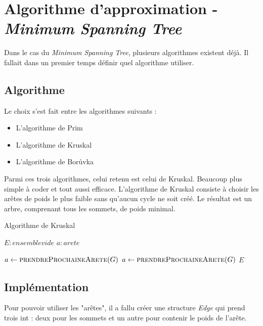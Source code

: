 \chapter{Algorithme d'approximation - \textit{Minimum Spanning Tree}}


Dans le cas du \textit{Minimum Spanning Tree}, plusieurs algorithmes existent déjà. Il fallait dans un premier temps définir quel algorithme utiliser.

\section{Algorithme}

Le choix s'est fait entre les algorithmes suivants :
\begin{itemize}
	\item L'algorithme de Prim
	\item L'algorithme de Kruskal
	\item L'algorithme de Borůvka
\end{itemize}

Parmi ces trois algorithmes, celui retenu est celui de Kruskal. Beaucoup plus simple à coder et tout aussi efficace.
L'algorithme de Kruskal consiste à choisir les arêtes de poids le plus faible sans qu'aucun cycle ne soit créé. Le résultat est un arbre, comprenant tous les sommets, de poids minimal.

\begin{algorithm}
\caption{Algorithme de Kruskal}
\begin{algorithmic}



\State $E : ensemble vide$
\State $a : arete$

\State {}
\State $a \gets \Call{prendreProchaineArete}{G}$
		\State {}
	\EndIf
	\State $ a \gets \Call{prendreProchaineArete}{G}$
\EndWhile
\State \Return $E$
\EndFunction
\end{algorithmic}
\end{algorithm}

\section{Implémentation}

Pour pouvoir utiliser les "arêtes", il a fallu créer une structure \textit{Edge} qui prend trois int : deux pour les sommets et un autre pour contenir le poids de l'arête.


